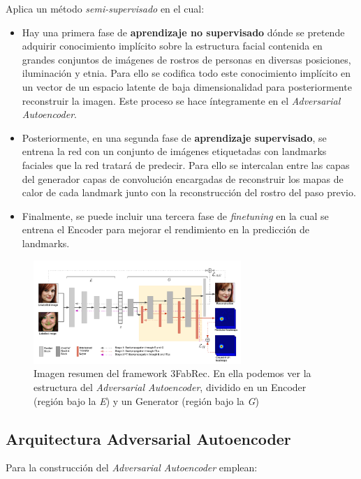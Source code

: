         \medskip

        \noindent Aplica un método \textit{semi-supervisado} en el cual:

        \begin{itemize}
            \item Hay una primera fase de \textbf{aprendizaje no supervisado} dónde se pretende adquirir conocimiento implícito sobre la estructura facial contenida en grandes conjuntos de imágenes de rostros de personas en diversas posiciones, iluminación y etnia. Para ello se codifica todo este conocimiento implícito en un vector de un espacio latente de baja dimensionalidad para posteriormente reconstruir la imagen. Este proceso se hace íntegramente en el \textit{Adversarial Autoencoder}.
            \item Posteriormente, en una segunda fase de \textbf{aprendizaje supervisado}, se entrena la red con un conjunto de imágenes etiquetadas con landmarks faciales que la red tratará de predecir. Para ello se intercalan entre las capas del generador capas de convolución encargadas de reconstruir los mapas de calor de cada landmark junto con la reconstrucción del rostro del paso previo.
            \item Finalmente, se puede incluir una tercera fase de \textit{finetuning} en la cual se entrena el Encoder para mejorar el rendimiento en la predicción de landmarks.
        \end{itemize} 

        \begin{figure}[!h]
            \centering
            \includegraphics[width=0.7\textwidth]{img/3fabrec_arquitectura.png}
            \caption{Imagen resumen del framework 3FabRec. En ella podemos ver la estructura del \textit{Adversarial Autoencoder}, dividido en un Encoder (región bajo la \textit{E}) y un Generator (región bajo la \textit{G}) }
            \label{fig:3FabRec Resumen}
        \end{figure}

        \subsection{Arquitectura Adversarial Autoencoder}
            \noindent Para la construcción del \textit{Adversarial Autoencoder} emplean:
            
